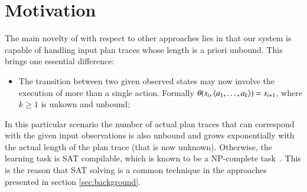 \section{Motivation}
\label{sec:motivation}

The main novelty of \FAMA with respect to other approaches lies in that our system is capable of handling input plan traces whose length is a priori unbound. This brings one essential difference:
\begin{itemize}
\item The transition between two given observed states may now involve the execution of more than a single action. Formally $\theta(s_i,{\langle a_1,\ldots,a_k \rangle})=s_{i+1}$, where $k\geq 1$ is unkown and unbound; 
\end{itemize}

In this particular scenario the number of actual plan traces that can correspond with the given input observations is also unbound and grows exponentially with the actual length of the plan trace (that is now unknown). Otherwise, the learning task is SAT compilable, which is known to be a NP-complete task~\cite{russell2016artificial}. This is the reason that SAT solving is a common technique in the approaches presented in section \ref{sec:background}.


